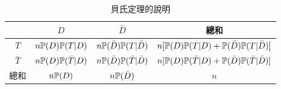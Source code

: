     \begin{table}[htbp]
        \begin{center}
            \begin{tabular}{c|cc|c}
                \toprule
                 & $D$ & $\bar{D}$ & 總和\\
                \hline
                $T$ & $n\mathbb{P}(D)\mathbb{P}(T|D)$ & $n\mathbb{P}(\bar{D})\mathbb{P}(T|\bar{D})$ & $n[\mathbb{P}(D)\mathbb{P}(T|D) + \mathbb{P}(\bar{D})\mathbb{P}(T|\bar{D})]$\\
                $\bar{T}$ & $n\mathbb{P}(D)\mathbb{P}(\bar{T}|D)$  & $n\mathbb{P}(\bar{D})\mathbb{P}(\bar{T}|\bar{D})$ & $n[\mathbb{P}(D)\mathbb{P}(\bar{T}|D) + \mathbb{P}(\bar{D})\mathbb{P}(\bar{T}|\bar{D})]$\\
                \hline
                總和 & $n\mathbb{P}(D)$ & $n\mathbb{P}(\bar{D})$ & $n$\\
                \bottomrule
            \end{tabular}
            \caption{貝氏定理的說明\label{tab:Bayes}}
        \end{center}
    \end{table}
    
